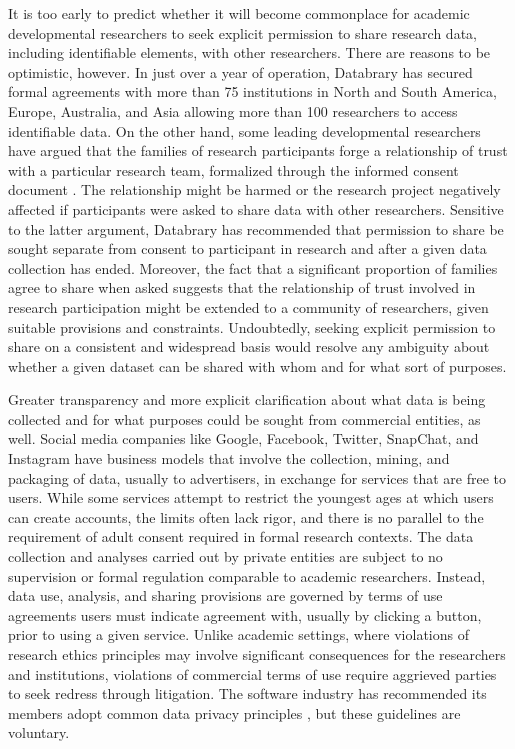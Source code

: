 \documentclass[letterpaper,man,apacite]{apa6}
\begin{document}
It is too early to predict whether it will become commonplace for academic developmental researchers to seek explicit permission to share research data, including identifiable elements, with other researchers.
There are reasons to be optimistic, however.
In just over a year of operation, Databrary has secured formal agreements with more than 75 institutions in North and South America, Europe, Australia, and Asia allowing more than 100 researchers to access identifiable data.
On the other hand, some leading developmental researchers have argued that the families of research participants forge a relationship of trust with a particular research team, formalized through the informed consent document \cite{Eisenberg-APS}.
The relationship might be harmed or the research project negatively affected if participants were asked to share data with other researchers.
Sensitive to the latter argument, Databrary has recommended that permission to share be sought separate from consent to participant in research and after a given data collection has ended.
Moreover, the fact that a significant proportion of families agree to share when asked suggests that the relationship of trust involved in research participation might be extended to a community of researchers, given suitable provisions and constraints.
Undoubtedly, seeking explicit permission to share on a consistent and widespread basis would resolve any ambiguity about whether a given dataset can be shared with whom and for what sort of purposes.

Greater transparency and more explicit clarification about what data is being collected and for what purposes could be sought from commercial entities, as well.
Social media companies like Google, Facebook, Twitter, SnapChat, and Instagram have business models that involve the collection, mining, and packaging of data, usually to advertisers, in exchange for services that are free to users.
While some services attempt to restrict the youngest ages at which users can create accounts, the limits often lack rigor, and there is no parallel to the requirement of adult consent required in formal research contexts.
The data collection and analyses carried out by private entities are subject to no supervision or formal regulation comparable to academic researchers.
Instead, data use, analysis, and sharing provisions are governed by terms of use agreements users must indicate agreement with, usually by clicking a button, prior to using a given service.
Unlike academic settings, where violations of research ethics principles may involve significant consequences for the researchers and institutions, violations of commercial terms of use require aggrieved parties to seek redress through litigation.
The software industry has recommended its members adopt common data privacy principles \cite{}, but these guidelines are voluntary.
\end{document}
